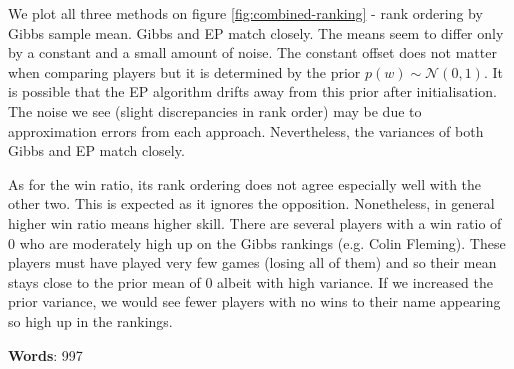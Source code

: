 \documentclass[]{article}
\newcommand{\Ncal}{\mathcal{N}}
\begin{document}
We plot all three methods on figure \ref{fig:combined-ranking} - rank ordering by Gibbs sample mean. Gibbs and EP match closely. The means seem to differ only by a constant and a small amount of noise. The constant offset does not matter when comparing players but it is determined by the prior $p(w) \sim \Ncal(0, 1)$. It is possible that the EP algorithm drifts away from this prior after initialisation. The noise we see (slight discrepancies in rank order) may be due to approximation errors from each approach. Nevertheless, the variances of both Gibbs and EP match closely.

As for the win ratio, its rank ordering does not agree especially well with the other two. This is expected as it ignores the opposition. Nonetheless, in general higher win ratio means higher skill. There are several players with a win ratio of 0 who are moderately high up on the Gibbs rankings (e.g. Colin Fleming). These players must have played very few games (losing all of them) and so their mean stays close to the prior mean of 0 albeit with high variance. If we increased the prior variance, we would see fewer players with no wins to their name appearing so high up in the rankings.

\textbf{Words}: 997
\end{document}
